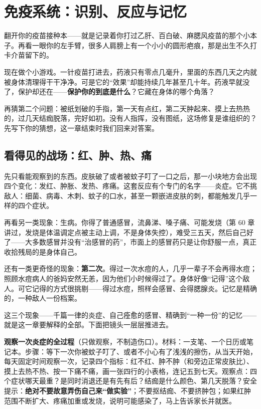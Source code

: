 \chapter{免疫系统：识别、反应与记忆}

\begin{kaichang}
翻开你的疫苗接种本——就是记录着你打过乙肝、百白破、麻腮风疫苗的那个小本子。再看一眼你的左手臂，很多人肩膀上有一个小小的圆形疤痕，那是出生不久打卡介苗留下的。

现在做个小游戏。一针疫苗打进去，药液只有零点几毫升，里面的东西几天之内就被身体清理得干干净净。可是它的“效果”却能持续几年甚至几十年。药液早就没了，保护却还在——\textbf{保护你的到底是什么}？它藏在身体的哪个角落？

再猜第二个问题：被纸划破的手指，第一天有点红，第二天肿起来、摸上去热热的，过几天结痂脱落，完好如初。没有人指挥，没有图纸，这场修复是谁组织的？先写下你的猜想，这一章结束时我们回来对答案。
\end{kaichang}

\section{看得见的战场：红、肿、热、痛}

先只看能观察到的东西。皮肤破了或者被蚊子叮了一口之后，那一小块地方会出现四个变化：发红、肿胀、发热、疼痛。这套反应有个专门的名字——炎症。它不挑敌人：细菌、病毒、木刺、蚊子的口水，甚至一颗嵌进皮肤的刺，都能触发几乎一样的四个症状。

再看另一类现象：生病。你得了普通感冒，流鼻涕、嗓子痛、可能发烧（第 60 章讲过，发烧是体温调定点被主动上调，不是身体失控），难受三五天，然后自己好了——大多数感冒并没有“治感冒的药”，市面上的感冒药只是让你舒服一点，真正收拾残局的是身体自己。

还有一类更奇怪的现象：\textbf{第二次}。得过一次水痘的人，几乎一辈子不会再得水痘；照顾水痘病人的爸妈安然无恙，因为他们小时候得过了。身体好像“记得”这个敌人。可它记得的方式很挑剔——得过水痘，照样会感冒、会得腮腺炎。记忆是精确的，一种敌人一份档案。

这三个现象——千篇一律的炎症、自己痊愈的感冒、精确到“一种一份”的记忆——就是这一章要解释的全部。下面把镜头一层层推进去。

\begin{shiyan}
\textbf{观察一次炎症的全过程}（只做观察，不制造伤口）。材料：一支笔、一个日历或笔记本。步骤：等下一次你被蚊子叮了、或者不小心有了浅浅的擦伤，从当天开始，每天固定时间观察一次，记录四个指标：红不红、肿不肿（和旁边正常皮肤比）、摸上去热不热、按一下痛不痛，画一张四行的小表格，连记五到七天。观察点：四个症状哪天最重？是同时消退还是有先有后？结痂是什么颜色、第几天脱落？安全提示：\textbf{绝对不要故意弄伤自己来“做实验”}；不要抠结痂、不要挤肿包；如果红肿范围不断扩大、疼痛加重或发烧，说明可能感染了，马上告诉家长并就医。
\end{shiyan}

